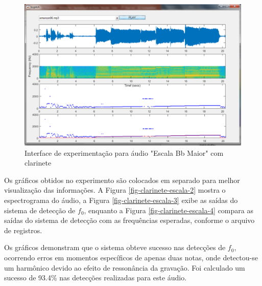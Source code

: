 \begin{figure}
	\centering
	\includegraphics[width=0.75\linewidth]{pasta1_figuras/clarinete-escala.png}
	\caption{Interface de experimentação para áudio "Escala Bb Maior" com clarinete}
	\label{fig-clarinete-escala}
\end{figure}

Os gráficos obtidos no experimento são colocados em separado para melhor visualização das informações. A Figura \ref{fig-clarinete-escala-2} mostra o espectrograma do áudio, a Figura \ref{fig-clarinete-escala-3} exibe as saídas do sistema de detecção de $f_0$, enquanto a Figura \ref{fig-clarinete-escala-4} compara as saídas do sistema de detecção com as frequências esperadas, conforme o arquivo de registros.


Os gráficos demonstram que o sistema obteve sucesso nas detecções de $f_0$, ocorrendo erros em momentos específicos de apenas duas notas, onde detectou-se um harmônico devido ao efeito de ressonância da gravação. Foi calculado um sucesso de 93.4\% nas detecções realizadas para este áudio.


